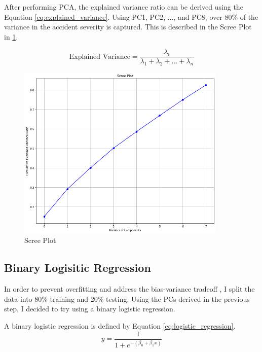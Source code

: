 \noindent
After performing PCA, the explained variance ratio can be derived using the Equation \ref{eq:explained_variance}. Using PC1, PC2, ..., and PC8, over 80\% of the variance in the accident severity is captured. This is described in the Scree Plot in \cref{fig:scree_plot}.

\begin{equation} \label{eq:explained_variance}
    \text{Explained Variance} = \frac{\lambda_i}{\lambda_1 + \lambda_2 + \dots +\lambda_n}
\end{equation}

\begin{figure}[H]
    \centering
    \includegraphics[width=100mm,height=\textheight,keepaspectratio]{images/scree_plot.png}
    \caption{Scree Plot}
    \label{fig:scree_plot}
\end{figure}

\subsection{Binary Logisitic Regression}
\label{section:logistic_regression}
In order to prevent overfitting and address the bias-variance tradeoff \citep{belkin2019reconciling}, I split the data into 80\% training and 20\% testing. Using the PCs derived in the previous step, I decided to try using a binary logistic regression.

\noindent
\newline
A binary logistic regression is defined by Equation \ref{eq:logistic_regression}.
\begin{equation} \label{eq:logistic_regression}
    y=\frac{1}{1+e^{-\left(\beta_0 + \beta_1 x \right)}}
\end{equation}

